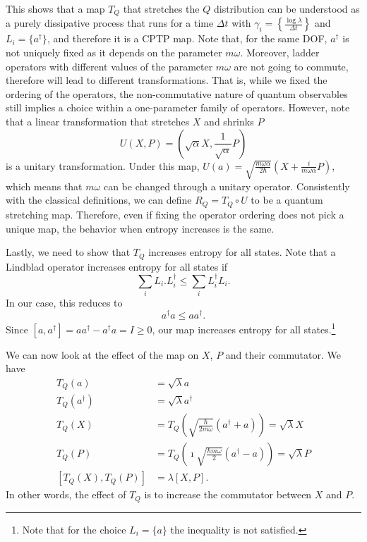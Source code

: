 \documentclass{article}
\begin{document}
This shows that a map $T_Q$ that stretches the $Q$ distribution can be understood as a purely dissipative process that runs for a time $\Delta t$ with $\gamma_i = \left\{ \frac{\log \lambda} {\Delta t} \right\}$ and $L_i = \{ a^\dagger\}$, and therefore it is a CPTP map. Note that, for the same DOF, $a^\dagger$ is not uniquely fixed as it depends on the parameter $m\omega$. Moreover, ladder operators with different values of the parameter $m\omega$ are not going to commute, therefore will lead to different transformations. That is, while we fixed the ordering of the operators, the non-commutative nature of quantum observables still implies a choice within a one-parameter family of operators.  However, note that a linear transformation that stretches $X$ and shrinks $P$
\begin{equation}
	U(X, P) = \left(\sqrt{\alpha} X, \frac{1}{\sqrt{\alpha}} P\right)
\end{equation}
is a unitary transformation. Under this map, $U(a) = \sqrt{\frac{m\omega\alpha}{2\hbar}}(X+\frac{i}{m\omega\alpha}P)$, which means that $m\omega$ can be changed through a unitary operator. Consistently with the classical definitions, we can define $R_Q = T_Q \circ U$ to be a quantum stretching map. Therefore, even if fixing the operator ordering does not pick a unique map, the behavior when entropy increases is the same.

Lastly, we need to show that $T_Q$ increases entropy for all states. Note that a Lindblad operator increases entropy for all states if\cite{Benatti1988}
\begin{equation}
	\sum_i L_i.L_i^\dagger \leq \sum_i L_i^\dagger L_i.
\end{equation}
In our case, this reduces to 
\begin{equation}
	a^\dagger a \leq a a^\dagger.
\end{equation}
Since $[a, a^\dagger] = a a^\dagger - a^\dagger a = I \geq 0$, our map increases entropy for all states.\footnote{Note that for the choice $L_i=\{a\}$ the inequality is not satisfied.}

We can now look at the effect of the map on $X$, $P$ and their commutator. We have
\begin{align}
    T_Q(a) &= \sqrt{\lambda} a \\ 
    T_Q(a^\dagger) &= \sqrt{\lambda} a^\dagger \\ 
    T_Q(X) &= T_Q\left(\sqrt{\frac{\hbar}{2m\omega}}(a^\dagger + a)\right) = \sqrt{\lambda} X \\
    T_Q(P) &= T_Q(\imath\sqrt{\frac{\hbar m \omega}{2}}(a^\dagger - a)) = \sqrt{\lambda} P \\
    [T_Q(X), T_Q(P)] &= \lambda [X, P].
\end{align}
In other words, the effect of $T_Q$ is to increase the commutator between $X$ and $P$. 
\end{document}
